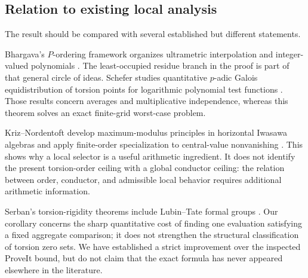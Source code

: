 \subsection{Relation to existing local analysis}
The result should be compared with several established but different statements.

Bhargava's \(P\)-ordering framework organizes ultrametric interpolation and integer-valued polynomials \cite{bhargava}. The least-occupied residue branch in the proof is part of that general circle of ideas. Schefer studies quantitative \(p\)-adic Galois equidistribution of torsion points for logarithmic polynomial test functions \cite{schefer}. Those results concern averages and multiplicative independence, whereas this theorem solves an exact finite-grid worst-case problem.

Kriz--Nordentoft develop maximum-modulus principles in horizontal Iwasawa algebras and apply finite-order specialization to central-value nonvanishing \cite{kn}. This shows why a local selector is a useful arithmetic ingredient. It does not identify the present torsion-order ceiling with a global conductor ceiling: the relation between order, conductor, and admissible local behavior requires additional arithmetic information.

Serban's torsion-rigidity theorems include Lubin--Tate formal groups \cite{serban}. Our corollary concerns the sharp quantitative cost of finding one evaluation satisfying a fixed aggregate comparison; it does not strengthen the structural classification of torsion zero sets. We have established a strict improvement over the inspected ProveIt bound, but do not claim that the exact formula has never appeared elsewhere in the literature.

